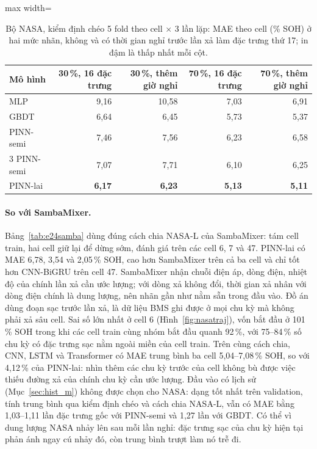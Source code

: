 \documentclass[12pt,a4paper,oneside]{report}
\theoremstyle{plain}
\theoremstyle{definition}
\begin{document}
\begin{table}[!htbp]\centering\small
\caption[Bộ NASA, kiểm định chéo theo cell]{Bộ NASA, kiểm định chéo 5 fold theo cell $\times$ 3 lần lặp: MAE theo cell (\% SOH) ở hai mức nhãn, không và có thời gian nghỉ trước lần xả làm đặc trưng thứ 17; in đậm là thấp nhất mỗi cột.}\label{tab:e24cv}
\begin{adjustbox}{max width=\textwidth}\begin{tabular}{lrrrr}\toprule
Mô hình & 30\,\%, 16 đặc trưng & 30\,\%, thêm giờ nghỉ & 70\,\%, 16 đặc trưng & 70\,\%, thêm giờ nghỉ \\\midrule
MLP & 9{,}16 & 10{,}58 & 7{,}03 & 6{,}91 \\
GBDT & 6{,}64 & 6{,}45 & 5{,}73 & 5{,}37 \\
PINN-semi & 7{,}46 & 7{,}56 & 6{,}23 & 6{,}58 \\
3 PINN-semi & 7{,}07 & 7{,}71 & 6{,}10 & 6{,}25 \\
PINN-lai & \textbf{6{,}17} & \textbf{6{,}23} & \textbf{5{,}13} & \textbf{5{,}11} \\
\bottomrule\end{tabular}\end{adjustbox}\end{table}


\paragraph{So với SambaMixer.} Bảng~\ref{tab:e24samba} dùng đúng cách chia NASA-L của SambaMixer: tám cell train, hai cell
giữ lại để dừng sớm, đánh giá trên các cell 6, 7 và 47. PINN-lai có MAE 6{,}78, 3{,}54 và 2{,}05\,\% SOH, cao hơn
SambaMixer trên cả ba cell và chỉ tốt hơn CNN-BiGRU trên cell 47. SambaMixer nhận chuỗi điện áp, dòng điện, nhiệt độ của chính lần xả cần ước lượng; với dòng xả không đổi, thời gian xả
nhân với dòng điện chính là dung lượng, nên nhãn gần như nằm sẵn trong đầu vào. Đồ án dùng đoạn sạc trước lần xả, là
dữ liệu BMS ghi được ở mọi chu kỳ mà không phải xả sâu cell. Sai số lớn nhất ở cell 6 (Hình~\ref{fig:nasatraj}), vốn bắt đầu ở 101\,\% SOH trong khi
các cell train cùng nhóm bắt đầu quanh 92\,\%, với 75--84\,\% số chu kỳ có đặc trưng sạc nằm ngoài miền của cell
train. Trên cùng cách chia, CNN, LSTM và Transformer có MAE trung bình ba cell 5{,}04--7{,}08\,\% SOH, so với 4{,}12\,\% của PINN-lai: nhìn thêm các chu kỳ trước của cell không bù được việc thiếu đường xả của chính chu kỳ cần ước lượng. Đầu vào có lịch sử (Mục~\ref{sec:hist_m}) không được chọn cho NASA: dạng tốt nhất trên validation, tính trung bình qua kiểm định chéo và cách chia NASA-L, vẫn có MAE bằng 1{,}03--1{,}11 lần đặc trưng gốc với PINN-semi và 1{,}27 lần với GBDT. Có thể vì dung lượng NASA nhảy lên sau mỗi lần nghỉ: đặc trưng sạc của chu kỳ hiện tại phản ánh ngay cú nhảy đó, còn trung bình trượt làm nó trễ đi.
\end{document}
